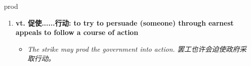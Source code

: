 
\begin{frame}
{\huge prod}
\begin{center}
\begin{enumerate}\Large
  \item \textbf{vt. 促使......行动: to try to persuade (someone) through earnest appeals to follow a course of action}
  \begin{itemize}
    \item \em{\Large{The strike may prod the government into action. 罢工也许会迫使政府采取行动。}}
  \end{itemize}
\end{enumerate}
\end{center}
\end{frame}
